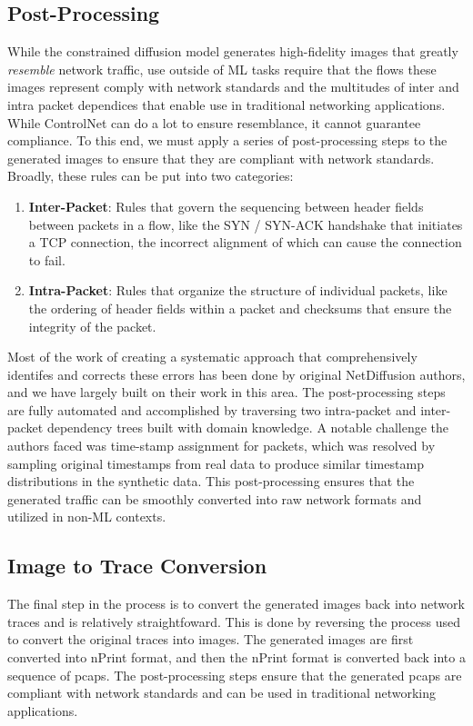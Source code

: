 \documentclass[acmsmall, nonacm]{acmart}
\begin{document}
\subsection{Post-Processing}
While the constrained diffusion model generates high-fidelity images
that greatly \textit{resemble} network traffic, use outside of ML tasks
require that the flows these images represent comply with network standards 
and the multitudes of inter and intra packet dependices that enable use 
in traditional networking applications. While ControlNet can do a lot to
ensure resemblance, it cannot guarantee compliance. To this end, 
we must apply a series
of post-processing steps to the generated images to ensure that they are
compliant with network standards. Broadly, these rules can be put into two
categories:
\begin{enumerate}
  \item \textbf{Inter-Packet}: Rules that govern the sequencing between
  header fields between packets in a flow, like the SYN / SYN-ACK handshake
  that initiates a TCP connection, the incorrect alignment of which can
  cause the connection to fail.
  \item \textbf{Intra-Packet}: Rules that organize the structure of individual
  packets, like the ordering of header fields within a packet and checksums
  that ensure the integrity of the packet.
\end{enumerate}

Most of the work of creating a systematic approach that comprehensively 
identifes and corrects these errors has been done by original 
NetDiffusion authors, and we have largely built on their work in this
area. The post-processing steps are fully automated and accomplished
by traversing two intra-packet and inter-packet dependency trees built
with domain knowledge. A notable challenge the authors faced was
time-stamp assignment for packets, which was resolved by sampling 
original timestamps from real data to produce similar timestamp distributions
in the synthetic data. This post-processing ensures that the generated
traffic can be smoothly converted into raw network formats and utilized
in non-ML contexts.

\subsection{Image to Trace Conversion}
The final step in the process is to convert the generated images back
into network traces and is relatively straightfoward.
This is done by reversing the process used to convert
the original traces into images. The generated images are first converted
into nPrint format, and then the nPrint format is converted back into
a sequence of pcaps. The post-processing steps ensure that the generated
pcaps are compliant with network standards and can be used in traditional
networking applications.
\end{document}
